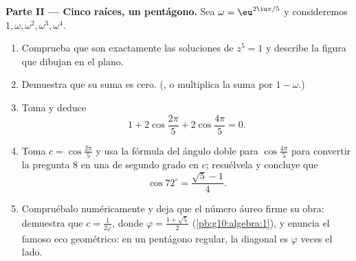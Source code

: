 \begin{problem}
\medskip
\noindent\textbf{Parte II --- Cinco raíces, un pentágono.}
Sea $\omega = \eu^{2\iu\pi/5}$ y consideremos
$1, \omega, \omega^2, \omega^3, \omega^4$.
\begin{enumerate}[resume]
  \item Comprueba que son exactamente las soluciones de $z^5 = 1$ y
        describe la figura que dibujan en el plano.
  \item Demuestra que su suma es cero. (, o multiplica
        la suma por $1 - \omega$.)
  \item Toma  y deduce
        \[
        1 + 2\cos\frac{2\pi}{5} + 2\cos\frac{4\pi}{5} = 0 .
        \]
  \item Toma $c = \cos\frac{2\pi}{5}$ y usa la fórmula del ángulo doble
        para $\cos\frac{4\pi}{5}$ para convertir la pregunta 8 en una
         de segundo grado en $c$; resuélvela y concluye que
        \[
        \cos 72^\circ = \frac{\sqrt5 - 1}{4} .
        \]
  \item Compruébalo numéricamente y deja que el número áureo firme su obra:
        demuestra que $c = \frac{1}{2\varphi}$, donde
        $\varphi = \frac{1 + \sqrt5}{2}$ (\cref{pb:g10:algebra:1}), y
        enuncia el famoso eco geométrico: en un pentágono regular, la
        diagonal es $\varphi$ veces el lado.
\end{enumerate}


\end{problem}
